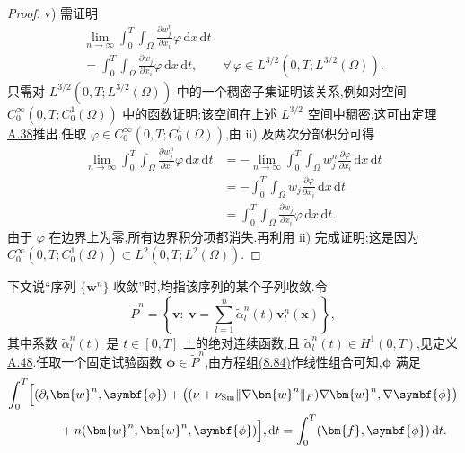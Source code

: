 \begin{lemma}[收敛子列的存在性]
\begin{proof}
v) 需证明
\[
\begin{aligned}
 \lim_{n\to\infty}\int_0^T\int_\Omega
       \frac{\partial w_j^n}{\partial x_i}\varphi\,
                      \mathrm{d}x\,\mathrm{d}t\\
 =\int_0^T\int_\Omega
       \frac{\partial w_j}{\partial x_i}\varphi\,
                      \mathrm{d}x\,\mathrm{d}t,
 \qquad
 \forall\,\varphi\in L^{3/2}(0,T;L^{3/2}(\Omega)).
\end{aligned}
\]
只需对 $L^{3/2}(0,T;L^{3/2}(\Omega))$ 中的一个稠密子集证明该关系,例如对空间
$C_0^\infty(0,T;C_0^1(\Omega))$ 中的函数证明;该空间在上述 $L^{3/2}$ 空间中稠密,这可由定理\hyperref[thm:appendix-a-38]{A.38}推出.任取 $\varphi\in C_0^\infty(0,T;C_0^1(\Omega))$,由 ii) 及两次分部积分可得
\[
\begin{aligned}
 \lim_{n\to\infty}\int_0^T\int_\Omega
       \frac{\partial w_j^n}{\partial x_i}\varphi\,
                       \mathrm{d}x\,\mathrm{d}t
 &=-\lim_{n\to\infty}\int_0^T\int_\Omega
       w_j^n\frac{\partial\varphi}{\partial x_i}\,
                       \mathrm{d}x\,\mathrm{d}t\\
 &=-\int_0^T\int_\Omega
       w_j\frac{\partial\varphi}{\partial x_i}\,
                       \mathrm{d}x\,\mathrm{d}t\\
 &=\int_0^T\int_\Omega
       \frac{\partial w_j}{\partial x_i}\varphi\,
                       \mathrm{d}x\,\mathrm{d}t.
\end{aligned}
\]
由于 $\varphi$ 在边界上为零,所有边界积分项都消失.再利用 ii) 完成证明;这是因为
$C_0^\infty(0,T;C_0^1(\Omega))\subset L^2(0,T;L^2(\Omega))$.
\end{proof}
\end{lemma}

\begin{note}[有限维问题的任意试验函数表述]
\label{note:smagorinsky-arbitrary-test-functions}
下文说“序列 $\{\bm{w}^n\}$ 收敛”时,均指该序列的某个子列收敛.令
\[
 \widetilde{P}^{n}
 =\left\{\bm{v}:\ \bm{v}
   =\sum_{l=1}^{n}\widetilde{\alpha}_{l}^{n}(t)
                    \bm{v}_{l}^{n}(\bm{x})\right\},
\]
其中系数 $\widetilde{\alpha}_{l}^{n}(t)$ 是 $t\in[0,T]$ 上的绝对连续函数,且
$\widetilde{\alpha}_{l}^{n}(t)\in H^{1}(0,T)$,见定义\hyperref[def:appendix-a-48]{A.48}.任取一个固定试验函数 $\symbf{\phi}\in\widetilde{P}^n$,由方程组\hyperref[eq:smagorinsky-galerkin-system]{(8.84)}作线性组合可知,$\symbf{\phi}$ 满足
\begin{equation}\label{eq:smagorinsky-galerkin-integrated-test}
\begin{aligned}
 \int_0^T\Bigl[& (\partial_t\bm{w}^n,\symbf{\phi})
 +\bigl((\nu+\nu_{\mathrm{Sm}}\|\nabla\bm{w}^n\|_F)
                 \nabla\bm{w}^n,\nabla\symbf{\phi}\bigr)\\
 &\qquad +n(\bm{w}^n,\bm{w}^n,\symbf{\phi})\Bigr],\mathrm{d}t
 =\int_0^T(\bm{f},\symbf{\phi})\,\mathrm{d}t.
\end{aligned}
\end{equation}
\end{note}

